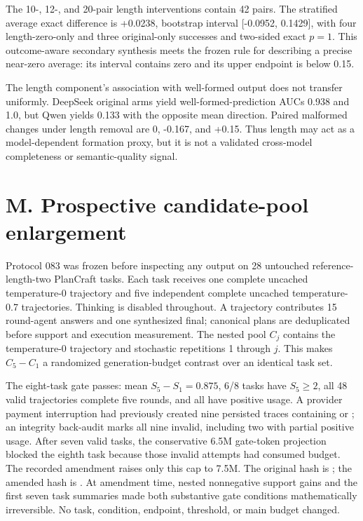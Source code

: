 \documentclass{article}
\begin{document}
The 10-, 12-, and 20-pair length interventions contain 42 pairs. The stratified average exact difference is +0.0238, bootstrap interval [-0.0952, 0.1429], with four length-zero-only and three original-only successes and two-sided exact \(p=1\). This outcome-aware secondary synthesis meets the frozen rule for describing a precise near-zero average: its interval contains zero and its upper endpoint is below 0.15.

The length component's association with well-formed output does not transfer uniformly. DeepSeek original arms yield well-formed-prediction AUCs 0.938 and 1.0, but Qwen yields 0.133 with the opposite mean direction. Paired malformed changes under length removal are 0, -0.167, and +0.15. Thus length may act as a model-dependent formation proxy, but it is not a validated cross-model completeness or semantic-quality signal.

\section{M. Prospective candidate-pool enlargement}

Protocol 083 was frozen before inspecting any output on 28 untouched reference-length-two PlanCraft tasks. Each task receives one complete uncached temperature-0 trajectory and five independent complete uncached temperature-0.7 trajectories. Thinking is disabled throughout. A trajectory contributes 15 round-agent answers and one synthesized final; canonical plans are deduplicated before support and execution measurement. The nested pool \(C_j\) contains the temperature-0 trajectory and stochastic repetitions 1 through \(j\). This makes \(C_5-C_1\) a randomized generation-budget contrast over an identical task set.

The eight-task gate passes: mean \(S_5-S_1=0.875\), 6/8 tasks have \(S_5\ge2\), all 48 valid trajectories complete five rounds, and all have positive usage. A provider payment interruption had previously created nine persisted traces containing \texttt{} or \texttt{}; an integrity back-audit marks all nine invalid, including two with partial positive usage. After seven valid tasks, the conservative 6.5M gate-token projection blocked the eighth task because those invalid attempts had consumed budget. The recorded amendment raises only this cap to 7.5M. The original hash is \texttt{}; the amended hash is \texttt{}. At amendment time, nested nonnegative support gains and the first seven task summaries made both substantive gate conditions mathematically irreversible. No task, condition, endpoint, threshold, or main budget changed.
\end{document}
